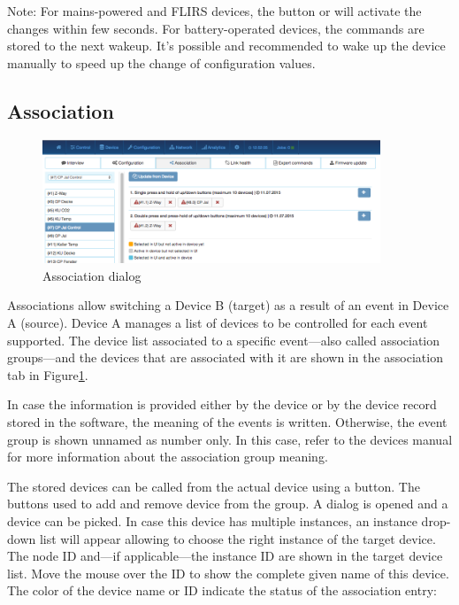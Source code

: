 Note: For mains-powered and FLIRS devices, the button  or
  will activate the changes within few seconds. For battery-operated 
 devices, the commands are stored to the next wakeup. It’s possible and recommended to 
 wake up the device manually to speed up the change of configuration values.

\subsection{Association}

\begin{figure}
\begin{center}
\includegraphics[width=0.9\textwidth]{pngs/cap7/eui34.png}
\caption{Association dialog}
\label{eui34}
\end{center}
\end{figure}

Associations allow switching a \zwave Device B (target) as a result of an event in 
\zwave Device A (source). \zwave Device A manages a list of devices to be controlled for 
each event supported. The device list associated to a specific event---also called 
association groups---and the devices that are associated with it are shown in the 
association tab in Figure\ref{eui34}.

In case the information is provided either by the device or by the device record 
stored in the software, the meaning of the events is written. Otherwise, the 
event group is shown unnamed as number only. In this case, refer to the devices 
manual for more information about the association group meaning.


The stored devices can be called from the actual device using a button. The buttons \keystroke{+/-} 
used to add and remove device from the group. A dialog is opened and a device can be picked. 
In case this device has multiple instances, an instance drop-down list will appear allowing 
to choose the right instance of the target device. The node ID and---if applicable---the 
instance ID are shown in the target device list. Move the mouse over the ID to show the 
complete given name of this device. The color of the device name or ID indicate the status 
of the association entry:

